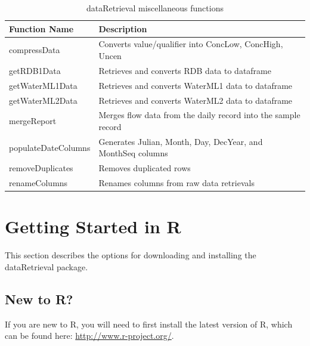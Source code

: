 \documentclass[a4paper,11pt]{article}\usepackage[]{graphicx}\usepackage[]{color}
\begin{document}

\begin{table}[!ht]
\begin{minipage}{\linewidth}
\begin{center}
\caption{dataRetrieval miscellaneous functions} 
\begin{tabular}{ll}
  \hline
Function Name & Description \\ 
  \hline
  compressData &  Converts value/qualifier into ConcLow, ConcHigh, Uncen\\
  getRDB1Data & Retrieves and converts RDB data to dataframe\\
  getWaterML1Data & Retrieves and converts WaterML1 data to dataframe\\
  getWaterML2Data & Retrieves and converts WaterML2 data to dataframe\\
  mergeReport & Merges flow data from the daily record into the sample record\\
  populateDateColumns & Generates Julian, Month, Day, DecYear, and MonthSeq columns\\
  removeDuplicates & Removes duplicated rows\\
  renameColumns & Renames columns from raw data retrievals\\
   \hline
\end{tabular}
\end{center}
\end{minipage}
\end{table}

\clearpage


\section{Getting Started in R}
\label{sec:appendix1}
This section describes the options for downloading and installing the dataRetrieval package.

\subsection{New to R?}
If you are new to R, you will need to first install the latest version of R, which can be found here: \url{http://www.r-project.org/}.
\end{document}
